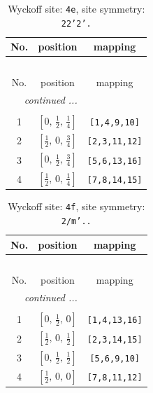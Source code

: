 \documentclass[fleqn,8pt]{jsarticle}
\begin{document}
\begin{longtable}{ccc}
\caption{Wyckoff site: {\tt 4e}, site symmetry: {\tt 22'2'.}}
 \\
 \hline \hline
No. & position & mapping \\ \hline \endfirsthead

\multicolumn{2}{l}{\tablename\ \thetable{}} \\
 \hline \hline
No. & position & mapping \\ \hline \endhead

 \hline \hline
\multicolumn{2}{r}{\footnotesize\it continued ...} \\ \endfoot

 \hline \hline
\multicolumn{2}{r}{} \\ \endlastfoot

1 & $\left[ 0,\, \frac{1}{2},\, \frac{1}{4} \right]$ & {\tt [1,4,9,10]} \\ \hline
2 & $\left[ \frac{1}{2},\, 0,\, \frac{3}{4} \right]$ & {\tt [2,3,11,12]} \\ \hline
3 & $\left[ 0,\, \frac{1}{2},\, \frac{3}{4} \right]$ & {\tt [5,6,13,16]} \\ \hline
4 & $\left[ \frac{1}{2},\, 0,\, \frac{1}{4} \right]$ & {\tt [7,8,14,15]} \\
\end{longtable}
\renewcommand{\arraystretch}{1.2}
\begin{longtable}{ccc}
\caption{Wyckoff site: {\tt 4f}, site symmetry: {\tt 2/m'..}}
 \\
 \hline \hline
No. & position & mapping \\ \hline \endfirsthead

\multicolumn{2}{l}{\tablename\ \thetable{}} \\
 \hline \hline
No. & position & mapping \\ \hline \endhead

 \hline \hline
\multicolumn{2}{r}{\footnotesize\it continued ...} \\ \endfoot

 \hline \hline
\multicolumn{2}{r}{} \\ \endlastfoot

1 & $\left[ 0,\, \frac{1}{2},\, 0 \right]$ & {\tt [1,4,13,16]} \\ \hline
2 & $\left[ \frac{1}{2},\, 0,\, \frac{1}{2} \right]$ & {\tt [2,3,14,15]} \\ \hline
3 & $\left[ 0,\, \frac{1}{2},\, \frac{1}{2} \right]$ & {\tt [5,6,9,10]} \\ \hline
4 & $\left[ \frac{1}{2},\, 0,\, 0 \right]$ & {\tt [7,8,11,12]} \\
\end{longtable}
\end{document}
